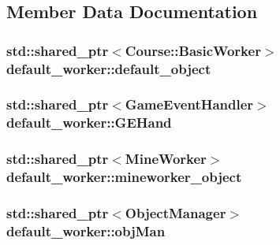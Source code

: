 \subsection{Member Data Documentation}
\hypertarget{classdefault__worker_a872779c575aa3b978bd368c9c120982f}{
\subsubsection[{default\-\_\-object}]{\setlength{\rightskip}{0pt plus 5cm}std\-::shared\-\_\-ptr$<${\bf Course\-::\-Basic\-Worker}$>$ default\-\_\-worker\-::default\-\_\-object\hspace{0.3cm}{\ttfamily [private]}}}\label{classdefault__worker_a872779c575aa3b978bd368c9c120982f}
\hypertarget{classdefault__worker_a44df0b6b6c93b3992dfbc912001c47d1}{
\subsubsection[{G\-E\-Hand}]{\setlength{\rightskip}{0pt plus 5cm}std\-::shared\-\_\-ptr$<${\bf Game\-Event\-Handler}$>$ default\-\_\-worker\-::\-G\-E\-Hand\hspace{0.3cm}{\ttfamily [private]}}}\label{classdefault__worker_a44df0b6b6c93b3992dfbc912001c47d1}
\hypertarget{classdefault__worker_a4e2482621b6bdd379211cc71006501ad}{
\subsubsection[{mineworker\-\_\-object}]{\setlength{\rightskip}{0pt plus 5cm}std\-::shared\-\_\-ptr$<${\bf Mine\-Worker}$>$ default\-\_\-worker\-::mineworker\-\_\-object\hspace{0.3cm}{\ttfamily [private]}}}\label{classdefault__worker_a4e2482621b6bdd379211cc71006501ad}
\hypertarget{classdefault__worker_af5dedfd6c8224ee5ca2eba1290f7a853}{
\subsubsection[{obj\-Man}]{\setlength{\rightskip}{0pt plus 5cm}std\-::shared\-\_\-ptr$<${\bf Object\-Manager}$>$ default\-\_\-worker\-::obj\-Man\hspace{0.3cm}{\ttfamily [private]}}}\label{classdefault__worker_af5dedfd6c8224ee5ca2eba1290f7a853}

